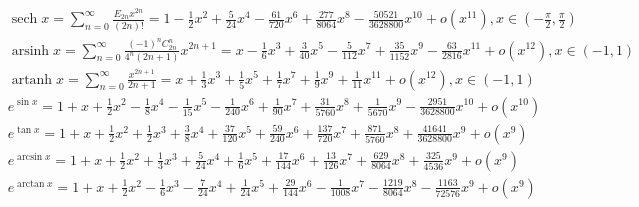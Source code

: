 \[\begin{aligned}
& \operatorname{sech} x=\sum_{n=0}^{\infty} \frac{E_{2 n} x^{2 n}}{(2 n)!}=1-\frac{1}{2} x^2+\frac{5}{24} x^4-\frac{61}{720} x^6+\frac{277}{8064} x^8-\frac{50521}{3628800} x^{10}+o\left(x^{11}\right), x \in\left(-\frac{\pi}{2}, \frac{\pi}{2}\right) \\
& \operatorname{arsinh} x=\sum_{n=0}^{\infty} \frac{(-1)^n C_{2 n}^n}{4^n(2 n+1)} x^{2 n+1}=x-\frac{1}{6} x^3+\frac{3}{40} x^5-\frac{5}{112} x^7+\frac{35}{1152} x^9-\frac{63}{2816} x^{11}+o\left(x^{12}\right), x \in(-1,1) \\
& \operatorname{artanh} x=\sum_{n=0}^{\infty} \frac{x^{2 n+1}}{2 n+1}=x+\frac{1}{3} x^3+\frac{1}{5} x^5+\frac{1}{7} x^7+\frac{1}{9} x^9+\frac{1}{11} x^{11}+o\left(x^{12}\right), x \in(-1,1) \\
& e^{\sin x}=1+x+\frac{1}{2} x^2-\frac{1}{8} x^4-\frac{1}{15} x^5-\frac{1}{240} x^6+\frac{1}{90} x^7+\frac{31}{5760} x^8+\frac{1}{5670} x^9-\frac{2951}{3628800} x^{10}+o\left(x^{10}\right) \\
& e^{\tan x}=1+x+\frac{1}{2} x^2+\frac{1}{2} x^3+\frac{3}{8} x^4+\frac{37}{120} x^5+\frac{59}{240} x^6+\frac{137}{720} x^7+\frac{871}{5760} x^8+\frac{41641}{3628800} x^9+o\left(x^9\right) \\
& e^{\arcsin x}=1+x+\frac{1}{2} x^2+\frac{1}{3} x^3+\frac{5}{24} x^4+\frac{1}{6} x^5+\frac{17}{144} x^6+\frac{13}{126} x^7+\frac{629}{8064} x^8+\frac{325}{4536} x^9+o\left(x^9\right) \\
& e^{\arctan x}=1+x+\frac{1}{2} x^2-\frac{1}{6} x^3-\frac{7}{24} x^4+\frac{1}{24} x^5+\frac{29}{144} x^6-\frac{1}{1008} x^7-\frac{1219}{8064} x^8-\frac{1163}{72576} x^9+o\left(x^9\right) 
\end{aligned}
\]
